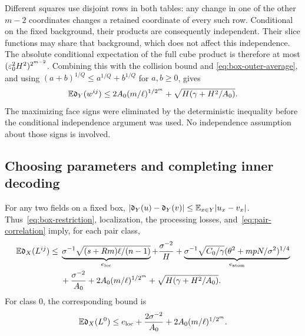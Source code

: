 Different squares use disjoint rows in both tables: any change in one
of the other $m-2$ coordinates changes a retained coordinate of
every such row. Conditional on the fixed background, their products
are consequently independent. Their slice functions may share that
background, which does not affect this independence. The absolute
conditional expectation of the full cube product is therefore at most
$(\varepsilon_0^2H^2)^{2^{m-2}}$.
Combining this with the collision bound and
\eqref{eq:box-outer-average}, and using
$(a+b)^{1/Q}\le a^{1/Q}+b^{1/Q}$ for $a,b\ge0$, gives
\begin{equation}\label{eq:pair-correlation}
 \mathbb E\mathfrak d_Y(w^{ij})
 \le2A_0(m/\ell)^{1/2^m}
     +\sqrt{H(\gamma+H^2/A_0)}.
\end{equation}
The maximizing face signs were eliminated by the deterministic
inequality before the conditional independence argument was used.
No independence assumption about those signs is involved.

\subsection{Choosing parameters and completing inner decoding}
\label{sec:inner-completion}

For any two fields on a fixed box,
$|\mathfrak d_Y(u)-\mathfrak d_Y(v)|\le\mathbb E_{x\in Y}|u_x-v_x|$.
Thus~\eqref{eq:box-restriction}, localization, the processing losses,
and~\eqref{eq:pair-correlation} imply, for each pair class,
\begin{align}
 \mathbb E\mathfrak d_X(L^{ij})
 \le{}&\underbrace{\sigma^{-1}
       \sqrt{(s+Rm)\ell/(n-1)}}_{e_{\mathrm{loc}}}
       +\frac{\sigma^{-2}}H
       +\underbrace{\sigma^{-1}\sqrt{C_0/\gamma}
           (\theta^2+mpN/\sigma^2)^{1/4}}_{e_{\mathrm{atom}}}
       \notag\\
      &+\frac{\sigma^{-2}}{A_0}
       +2A_0(m/\ell)^{1/2^m}
       +\sqrt{H(\gamma+H^2/A_0)}.
 \label{eq:six-errors}
\end{align}
For class $0$, the corresponding bound is
\begin{equation}\label{eq:zero-errors}
 \mathbb E\mathfrak d_X(L^0)
 \le e_{\mathrm{loc}}+\frac{2\sigma^{-2}}{A_0}
      +2A_0(m/\ell)^{1/2^m}.
\end{equation}

